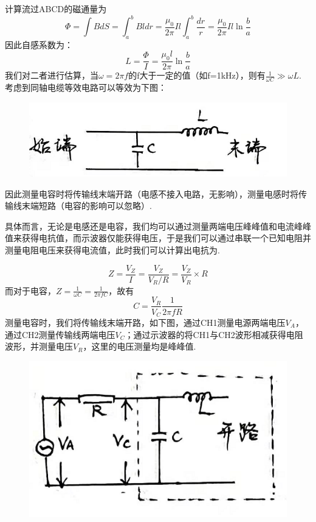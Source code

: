 \documentclass[UTF8]{ctexart}
\begin{document}
 计算流过ABCD的磁通量为
 \begin{equation}
    \varPhi=\int BdS=\int_a^bBldr=\frac{\mu_0}{2\pi}Il\int^b_a\frac{dr}{r}=\frac{\mu_0}{2\pi}Il\ln\frac{b}{a} 
 \end{equation}
 因此自感系数为：
  \begin{equation}
    L=\frac{\varPhi}{I}=\frac{\mu_0l}{2\pi}\ln\frac{b}{a} 
 \end{equation}
 我们对二者进行估算，当$\omega=2\pi f$的f大于一定的值（如f=1kHz），则有$\frac{1}{\omega C}\gg \omega L$. 考虑到同轴电缆等效电路可以等效为下图：\begin{figure}[H]\begin{center}
    \includegraphics[scale=0.5]{11.PNG}
\end{center}\end{figure}
 因此测量电容时将传输线末端开路（电感不接入电路，无影响），测量电感时将传输线末端短路（电容的影响可以忽略）.\par
 具体而言，无论是电感还是电容，我们均可以通过测量两端电压峰峰值和电流峰峰值来获得电抗值，而示波器仅能获得电压，于是我们可以通过串联一个已知电阻并测量电阻电压来获得电流值，此时我们可以计算出电抗为.\par
 \begin{equation}
    Z=\frac{V_Z}{I}=\frac{V_Z}{V_R/R}= \frac{V_Z}{V_R}\times R
    \label{qi}
 \end{equation}
 而对于电容，$Z=\frac{1}{\omega C}=\frac{1}{2\pi fC}$，故有
 \begin{equation}
    C=\frac{V_R}{V_C}\frac{1}{2\pi fR}
 \end{equation}
 测量电容时，我们将传输线末端开路，如下图，通过CH1测量电源两端电压$V_A$，通过CH2测量传输线两端电压$V_C$；通过示波器的将CH1与CH2波形相减获得电阻波形，并测量电压$V_R$，这里的电压测量均是峰峰值. 
 \begin{figure}[H]\begin{center}
    \includegraphics[scale=0.6]{12.PNG}
\end{center}\end{figure}
\end{document}
